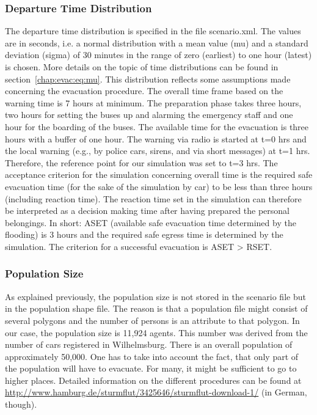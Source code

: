 \subsubsection{Departure Time Distribution}
The departure time distribution is specified in the file scenario.xml. The values are in seconds, i.e. a normal distribution with a mean value (mu) and a standard deviation (sigma) of 30 minutes in the range of zero (earliest) to one hour (latest) is chosen. 
More details on the topic of time distributions can be found in section~\ref{chap:evac:eq:mu}. This distribution reflects some assumptions made concerning the evacuation procedure. The overall time frame based on the warning time is 7 hours at minimum. The preparation phase takes three hours, two hours for setting the buses up and alarming the emergency staff and one hour for the boarding of the buses. The available time for the evacuation is three hours with a buffer of one hour. 
The warning via radio is started at t=0 hrs and the local warning (e.g., by police cars, sirens, and via short messages) at t=1 hrs. Therefore, the reference point for our simulation was set to t=3 hrs. The acceptance criterion for the simulation concerning overall time is the required safe evacuation time (for the sake of the simulation by car) to be less than three hours (including reaction time). The reaction time set in the simulation can therefore be interpreted as a decision making time after having prepared the personal belongings. In short: ASET (available safe evacuation time determined by the flooding) is 3 hours and the required safe egress time is determined by the simulation. The criterion for a successful evacuation is ASET > RSET.

\subsubsection{Population Size}
As explained previously, the population size is not stored in the scenario file but in the population shape file. The reason is that a population file might consist of several polygons and the number of persons is an attribute to that polygon. In our case, the population size is 11,924 agents. This number was derived from the number of cars registered in Wilhelmsburg. There is an overall population of approximately 50,000. One has to take into account the fact, that only part of the population will have to evacuate. For many, it might be sufficient to go to higher places. Detailed information on the different procedures can be found at \url{http://www.hamburg.de/sturmflut/3425646/sturmflut-download-1/} (in German, though).

